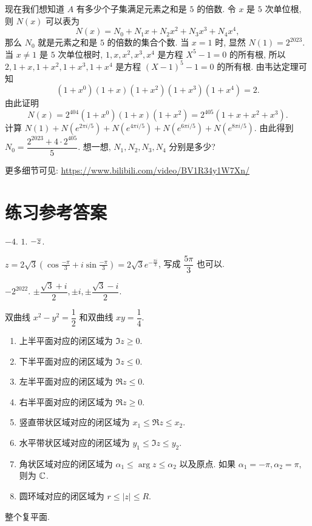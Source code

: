 \begin{homework}
\begin{exlist}
\begin{tasks}
        \task 现在我们想知道 $A$ 有多少个子集满足元素之和是 $5$ 的倍数.
      令 $x$ 是 $5$ 次单位根, 则 $N(x)$ 可以表为
      \[N(x)=N_0+N_1x+N_2x^2+N_3x^3+N_4x^4,\]
        那么 $N_0$ 就是元素之和是 $5$ 的倍数的集合个数.
        \task 当 $x=1$ 时, 显然 $N(1)=2^{2023}$.
        当 $x\neq 1$ 是 $5$ 次单位根时, $1,x,x^2,x^3,x^4$ 是方程 $X^5-1=0$ 的所有根, 所以 $2,1+x,1+x^2,1+x^3,1+x^4$ 是方程 $(X-1)^5-1=0$ 的所有根. 由韦达定理可知
        \[(1+x^0)(1+x)(1+x^2)(1+x^3)(1+x^4)=2.\]
        由此证明
        \[N(x)=2^{404}(1+x^0)(1+x)(1+x^2)=2^{405}(1+x+x^2+x^3).\]
        \task 计算 $N(1)+N(e^{2\pi i/5})+N(e^{4\pi i/5})+N(e^{6\pi i/5})+N(e^{8\pi i/5})$. 由此得到 $N_0=\dfrac{2^{2023}+4\cdot 2^{405}}5$.
        \task 想一想, $N_1,N_2,N_3,N_4$ 分别是多少?
      \end{tasks}
      更多细节可见: \url{https://www.bilibili.com/video/BV1R34y1W7Xn/}
  \end{exlist}  
\end{homework}

\section*{练习参考答案}
 $-4$.
 $1$.
 $-\overline z$.

 $\displaystyle z=2\sqrt3\left(\cos\frac{-\pi}3+i\sin\frac{-\pi}3\right)=2\sqrt3e^{-\frac{\pi i}3}$, 写成 $\dfrac{5\pi}3$ 也可以.

 $-2^{2022}$.
 $\pm\dfrac{\sqrt3+i}2,\pm i,\pm\dfrac{\sqrt3-i}2$.

 双曲线 $x^2-y^2=\dfrac12$ 和双曲线 $xy=\dfrac14$.
\begin{enumerate}
	\item 上半平面对应的闭区域为 $\Im z\ge0$.
	\item 下半平面对应的闭区域为 $\Im z\le0$.
	\item 左半平面对应的闭区域为 $\Re z\le0$.
	\item 右半平面对应的闭区域为 $\Re z\ge0$.
	\item 竖直带状区域对应的闭区域为 $x_1\le\Re z\le x_2$.
	\item 水平带状区域对应的闭区域为 $y_1\le\Im z\le y_2$.
	\item 角状区域对应的闭区域为 $\alpha_1\le \arg z\le \alpha_2$ 以及原点. 如果 $\alpha_1=-\pi,\alpha_2=\pi$, 则为 ${\mathbb{C}}$.
	\item 圆环域对应的闭区域为 $r\le|z|\le R$.
\end{enumerate}
 整个复平面.

